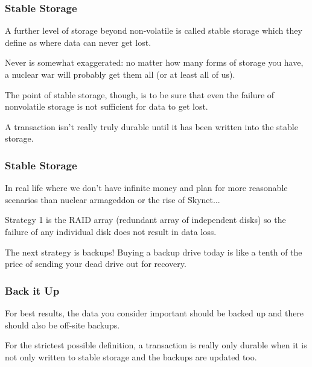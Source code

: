 \begin{frame}
\frametitle{Stable Storage}

A further level of storage beyond non-volatile is called \alert{stable storage} which they define as where data can never get lost. 

Never is somewhat exaggerated: no matter how many forms of storage you have, a nuclear war will probably get them all (or at least all of us). 

The point of stable storage, though, is to be sure that even the failure of nonvolatile storage is not sufficient for data to get lost.

A transaction isn't really truly durable until it has been written into the stable storage.


\end{frame}

\begin{frame}
\frametitle{Stable Storage}
In real life where we don't have infinite money and plan for more reasonable scenarios than nuclear armageddon or the rise of Skynet...

Strategy 1 is the RAID array (redundant array of independent disks) so the failure of any individual disk does not result in data loss. 

The next strategy is backups! Buying a backup drive today is like a tenth of the price of sending your dead drive out for recovery. 

\end{frame}

\begin{frame}
\frametitle{Back it Up}

For best results, the data you consider important should be backed up and there should also be off-site backups. 


For the strictest possible definition, a transaction is really only durable when it is not only written to stable storage and the backups are updated too.

\end{frame}



